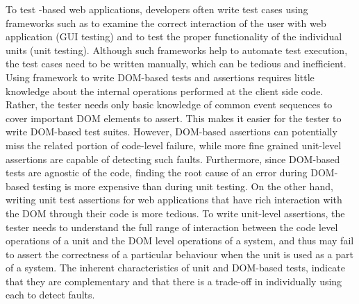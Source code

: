 To test \javascript-based web applications, developers
often write test cases using frameworks such as \selenium to examine the correct interaction of the user with web application (GUI testing) and \qunit to test the proper functionality of the individual units (unit testing).
Although such frameworks help to automate test execution, the
test cases need to be written manually, which can be tedious
and inefficient. 
Using \selenium framework to write DOM-based tests and assertions
requires little knowledge about the internal operations performed at the client side code. Rather, the tester needs only basic knowledge of common event sequences to cover important DOM elements to assert. 
This makes it easier for the tester to write DOM-based test suites. However, DOM-based assertions can potentially miss the related portion of
code-level failure, while more fine grained unit-level assertions are capable of detecting such faults. Furthermore, since DOM-based tests are agnostic of the \javascript code, finding the root cause of an error during DOM-based testing is more expensive than during unit testing. On the other hand,
writing unit test assertions for web applications that have rich interaction with the DOM through their \javascript code is more tedious. 
To write unit-level assertions, the tester needs to understand the full range of interaction between the code level operations of a unit and the DOM level operations of a system, and thus may fail to assert the correctness of a particular behaviour when the unit is used as a part of a system. The inherent characteristics of unit and DOM-based tests, indicate that they are complementary and that there is a trade-off in individually using each to detect faults. 

